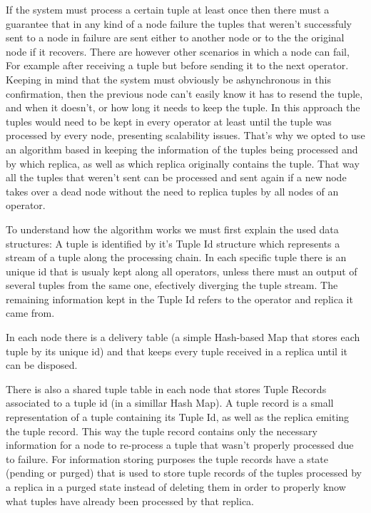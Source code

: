 \documentclass[times, 10pt,twocolumn]{article}
\begin{document}
If the system
must process a certain tuple at least once then there must a guarantee
that in any kind of a node failure the tuples that weren't successfuly
sent to a node in failure are sent either to another node or to the the
original node if it recovers. There are however other scenarios in which a
node can fail, For example after receiving a tuple but before sending it
to the next operator. Keeping in mind that the system must
obviously be ashynchronous in this confirmation, then the previous node
can't easily know it has to resend the tuple, and when it doesn't, or how
long it needs to keep the tuple.  In this approach the tuples would need
to be kept in every operator at least until the tuple was processed by
every node, presenting scalability issues. That's why we opted to use
an algorithm based in keeping the information of the tuples being processed
and by which replica, as well as which replica originally contains the tuple.
That way all the tuples that weren't sent can be processed and sent again
if a new node takes over a dead node without the need to replica tuples by
all nodes of an operator.



To understand how the
algorithm works we must first explain the used data structures: A tuple is
identified by it's Tuple Id structure which represents a stream of a tuple
along the processing chain. In each specific tuple there is an unique id
that is usualy kept along all operators, unless there must an output of
several tuples from the same one, efectively diverging the tuple stream.
The remaining information kept in the Tuple Id refers to the operator and
replica it came from. 

In each node there is a delivery table (a simple
Hash-based Map that stores each tuple by its unique id) and that keeps
every tuple received in a replica until it can be disposed.  

There is
also a shared tuple table in each node that stores Tuple Records
associated to a tuple id (in a simillar Hash Map). A tuple record is a
small representation of a tuple containing its Tuple Id, as well as the
replica emiting the tuple record. This way the tuple record contains only
the necessary information for a node to re-process a tuple that wasn't
properly processed due to failure. For information storing purposes the
tuple records have a state (pending or purged) that is used to store
tuple records of the tuples processed by a replica in a purged state
instead of deleting them in order to properly know what tuples have
already been processed by that replica.
\end{document}
